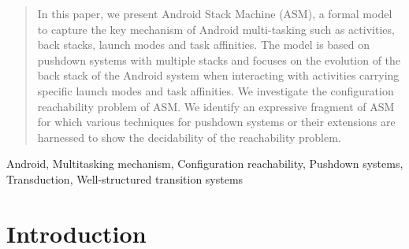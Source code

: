 \documentclass[preprint,12pt]{elsarticle}
\begin{document}
\begin{frontmatter}





 
\begin{abstract}
In this paper, we present Android Stack Machine (ASM), a formal model to capture the key mechanism  of Android multi-tasking such as activities, back stacks, launch modes and task affinities. The model is based on pushdown systems with multiple stacks and focuses on the evolution of the back stack of the Android system when interacting with activities carrying specific launch modes and task affinities. We investigate the configuration reachability problem of ASM. %
We identify an expressive fragment of ASM for which various techniques for pushdown systems or their extensions are harnessed to show the decidability of the reachability problem.
\end{abstract}



\begin{keyword}
Android, Multitasking mechanism, %
Configuration reachability, Pushdown systems, %
Transduction, %
Well-structured transition systems
\end{keyword}
\end{frontmatter}



\section{Introduction} \label{sec:intro}


\end{document}
